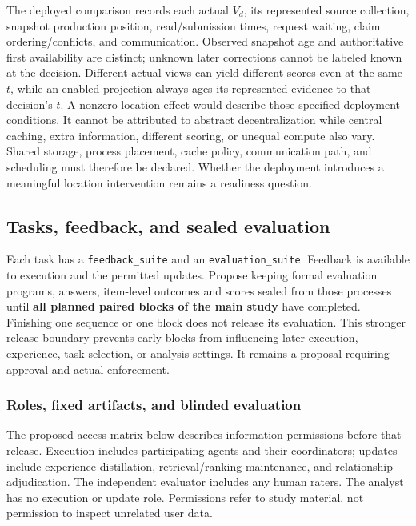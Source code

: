 \documentclass[
  english,
  11pt,
]{article}
\begin{document}
The deployed comparison records each actual \(V_d\), its represented
source collection, snapshot production position, read/submission times,
request waiting, claim ordering/conflicts, and communication. Observed
snapshot age and authoritative first availability are distinct; unknown
later corrections cannot be labeled known at the decision. Different
actual views can yield different scores even at the same \(t\), while an
enabled projection always ages its represented evidence to that
decision's \(t\). A nonzero location effect would describe those
specified deployment conditions. It cannot be attributed to abstract
decentralization while central caching, extra information, different
scoring, or unequal compute also vary. Shared storage, process
placement, cache policy, communication path, and scheduling must
therefore be declared. Whether the deployment introduces a meaningful
location intervention remains a readiness question.

\subsection{Tasks, feedback, and sealed
evaluation}\label{tasks-feedback-and-sealed-evaluation}

Each task has a \texttt{feedback\_suite} and an
\texttt{evaluation\_suite}. Feedback is available to execution and the
permitted updates. Propose keeping formal evaluation programs, answers,
item-level outcomes and scores sealed from those processes until
\textbf{all planned paired blocks of the main study} have completed.
Finishing one sequence or one block does not release its evaluation.
This stronger release boundary prevents early blocks from influencing
later execution, experience, task selection, or analysis settings. It
remains a proposal requiring approval and actual enforcement.

\subsubsection{Roles, fixed artifacts, and blinded
evaluation}\label{roles-fixed-artifacts-and-blinded-evaluation}

The proposed access matrix below describes information permissions
before that release. Execution includes participating agents and their
coordinators; updates include experience distillation, retrieval/ranking
maintenance, and relationship adjudication. The independent evaluator
includes any human raters. The analyst has no execution or update role.
Permissions refer to study material, not permission to inspect unrelated
user data.
\end{document}
